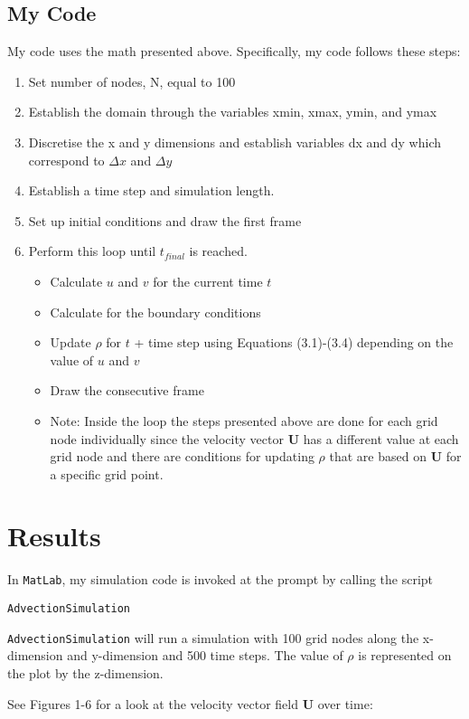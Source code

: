 \documentclass[12pt]{article}
\begin{document}
\subsection{My Code}
My code uses the math presented above. Specifically, my code follows these steps:
\begin{enumerate}
\item Set number of nodes, N, equal to 100
\item Establish the domain through the variables xmin, xmax, ymin, and ymax
\item Discretise the x and y dimensions and establish variables dx and dy which correspond to $\Delta x$ and $\Delta y$ 
\item Establish a time step and simulation length.
\item Set up initial conditions and draw the first frame
\item Perform this loop until $t_{final}$ is reached.
	\begin{itemize}
	\item Calculate $u$ and $v$ for the current time $t$
	\item Calculate for the boundary conditions
	\item Update $\rho$ for $t$ + time step using Equations (3.1)-(3.4) depending on the value of $u$ and $v$
	\item Draw the consecutive frame
	\item Note: Inside the loop the steps presented above are done for each grid node individually since the velocity vector \textbf{U} has a different value at each grid node and there are conditions for updating $\rho$ that are based on \textbf{U} for a specific grid point. 
	\end{itemize}
\end{enumerate}

\section{Results}\label{sec::results}
In \texttt{MatLab}, my simulation code is invoked at the prompt by calling the script 

\texttt{AdvectionSimulation}

\texttt{AdvectionSimulation}
will run a simulation with 100 grid nodes along the x-dimension and y-dimension and 500 time steps. The value of $\rho$ is represented on the plot by the z-dimension.

See Figures 1-6 for a look at the velocity vector field \textbf{U} over time:
\end{document}
